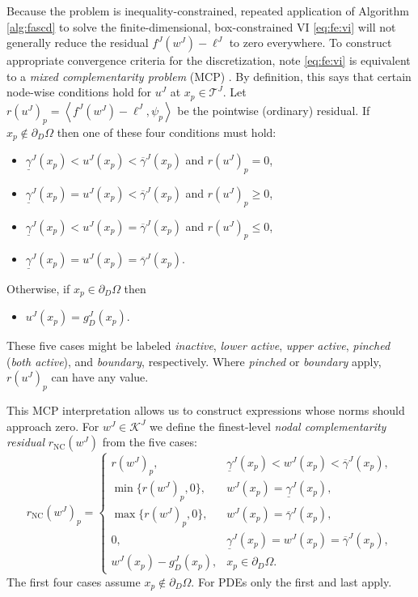 \documentclass[review,hidelinks,onefignum,onetabnum]{siamart220329}
\newcommand{\ip}[2]{\left<#1,#2\right>}
\newcommand{\rNC}{r_{\text{NC}}}
\begin{document}
Because the problem is inequality-constrained, repeated application of Algorithm \ref{alg:fascd} to solve the finite-dimensional, box-constrained VI \eqref{eq:fe:vi} will not generally reduce the residual $f^J(w^J) - \ell^J$ to zero everywhere.  To construct appropriate convergence criteria for the discretization, note \eqref{eq:fe:vi} is equivalent to a \emph{mixed complementarity problem} (MCP) \cite{FacchineiPang2003}.  By definition, this says that certain node-wise conditions hold for $u^J$ at $x_p \in \mathcal{T}^J$.  Let $r(u^J)_p = \ip{f^J(w^J)-\ell^J}{\psi_p}$ be the pointwise (ordinary) residual.  If $x_p \notin \partial_D\Omega$ then one of these four conditions must hold:
\begin{itemize}
\item $\underline{\gamma}^J(x_p)<u^J(x_p)<\overline{\gamma}^J(x_p)$ and $r(u^J)_p = 0$,
\item $\underline{\gamma}^J(x_p)=u^J(x_p)<\overline{\gamma}^J(x_p)$ and $r(u^J)_p \ge 0$,
\item $\underline{\gamma}^J(x_p)<u^J(x_p)=\overline{\gamma}^J(x_p)$ and $r(u^J)_p \le 0$,
\item $\underline{\gamma}^J(x_p)=u^J(x_p)=\overline{\gamma}^J(x_p)$.
\end{itemize}
Otherwise, if $x_p \in \partial_D\Omega$ then
\begin{itemize}
\item $u^J(x_p)=g_D^J(x_p)$.
\end{itemize}
These five cases might be labeled \emph{inactive}, \emph{lower active}, \emph{upper active}, \emph{pinched} (\emph{both active}), and \emph{boundary}, respectively.  Where \emph{pinched} or \emph{boundary} apply, $r(u^J)_p$ can have any value.

This MCP interpretation allows us to construct expressions whose norms should approach zero.  For $w^J \in \mathcal{K}^J$ we define the finest-level \emph{nodal complementarity residual} $\rNC(w^J)$ from the five cases:
\begin{equation}
\rNC(w^J)_p = \begin{cases}
    r(w^J)_p, & \underline{\gamma}^J(x_p) < w^J(x_p) < \overline{\gamma}^J(x_p), \\
    \min\{r(w^J)_p,0\}, & w^J(x_p) = \underline{\gamma}^J(x_p), \\
    \max\{r(w^J)_p,0\}, & w^J(x_p) = \overline{\gamma}^J(x_p), \\
    0, & \underline{\gamma}^J(x_p)=w^J(x_p)=\overline{\gamma}^J(x_p), \\
    w^J(x_p) - g_D^J(x_p), & x_p \in \partial_D\Omega. \end{cases} \label{eq:rNC}
\end{equation}
The first four cases assume $x_p \notin \partial_D\Omega$.  For PDEs only the first and last apply.
\end{document}
